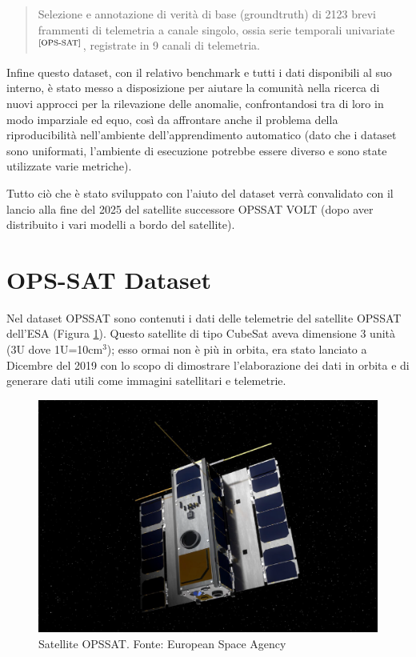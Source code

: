 \begin{quote}
    Selezione e annotazione di verità di base (ground\textunderscore truth) di 2123 brevi frammenti di telemetria a canale singolo, ossia serie temporali univariate$^{\text{\cite{OPS-SAT}}}$, registrate in 9 canali di telemetria.
\end{quote}

Infine questo dataset, con il relativo benchmark e tutti i dati disponibili al suo interno, è stato messo a disposizione per aiutare la comunità nella ricerca di nuovi approcci per la rilevazione delle anomalie, confrontandosi tra di loro in modo imparziale ed equo, così da affrontare anche il problema della riproducibilità nell'ambiente dell'apprendimento automatico (dato che i dataset sono uniformati, l'ambiente di esecuzione potrebbe essere diverso e sono state utilizzate varie metriche). 

Tutto ciò che è stato sviluppato con l'aiuto del dataset verrà convalidato con il lancio alla fine del 2025 del satellite successore OPS\textunderscore SAT VOLT (dopo aver distribuito i vari modelli a bordo del satellite).


\section{OPS-SAT Dataset}
Nel dataset OPS\textunderscore SAT sono contenuti i dati delle telemetrie del satellite OPS\textunderscore SAT dell'ESA (Figura \ref{fig:OP-SAT_satellite}). Questo satellite di tipo CubeSat aveva dimensione 3 unità (3U dove 1U=10cm$^3$); esso ormai non è più in orbita, era stato lanciato a Dicembre del 2019 con lo scopo di dimostrare l'elaborazione dei dati in orbita e di generare dati utili come immagini satellitari e telemetrie.

\begin{figure}[ht]
    \centering
    \includegraphics[width=0.5\linewidth]{images/Capitolo2/OP-SAT_satellite.png}
    \caption{Satellite OPS\textunderscore SAT. Fonte: European Space Agency}
    \label{fig:OP-SAT_satellite}
\end{figure}

